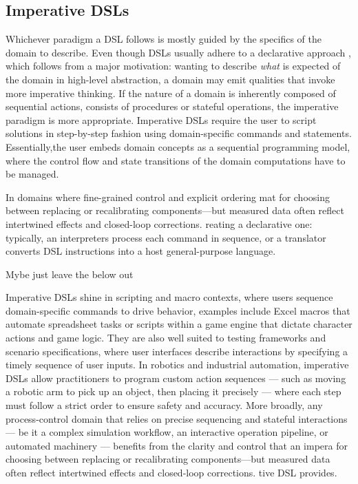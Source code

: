 \documentclass[11pt]{report}
\begin{document}
\subsection{Imperative DSLs}

Whichever paradigm a DSL follows is mostly guided by the specifics of the domain to describe. Even though DSLs usually adhere to a declarative approach \cite{sigplanDSL}, which follows from a
major motivation: wanting to describe \textit{what} is expected of the domain in high-level abstraction, a domain may emit qualities that invoke more imperative thinking.
If the nature of a domain is inherently composed of sequential actions, consists of procedures or stateful operations, the imperative paradigm is more appropriate.
Imperative DSLs require the user to script solutions in step-by-step fashion using domain-specific commands and statements. Essentially,the user embeds domain concepts as a sequential programming model,
where the control flow and state transitions of the domain computations have to be managed.

In domains where fine-grained control and explicit ordering mat
for choosing between replacing or recalibrating components—but measured data often reflect intertwined effects and closed-loop corrections. reating a declarative one: typically, an interpreters process each command in sequence, 
or a translator converts DSL instructions into a host general-purpose language.

Mybe just leave the below out

Imperative DSLs shine in scripting and macro contexts, where users sequence domain-specific commands to drive behavior, examples include Excel macros that
automate spreadsheet tasks or scripts within a game engine that dictate character actions and game logic. They are also well suited to testing frameworks
and scenario specifications, where user interfaces describe interactions by specifying a timely sequence of user inputs. In robotics and industrial automation, 
imperative DSLs allow practitioners to program custom action sequences — such as moving a robotic arm
to pick up an object, then placing it precisely — where each step must follow a strict order to ensure safety and accuracy. More broadly, any process-control 
domain that relies on precise sequencing and stateful interactions — be it a complex simulation workflow, an interactive operation pipeline, or automated machinery
— benefits from the clarity and control that an impera
for choosing between replacing or recalibrating components—but measured data often reflect intertwined effects and closed-loop corrections. tive DSL provides.
\end{document}
